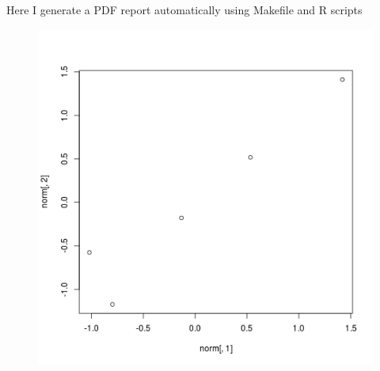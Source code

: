 \documentclass[10pt,a4paper]{report}
\author{Cyril Matthey-Doret}
\begin{document}
 Here I generate a PDF report automatically using Makefile and R scripts
 \begin{figure}
 	\includegraphics[width=\linewidth]{report.png}
 	\label{plot}
 \end{figure}
 
\end{document}
